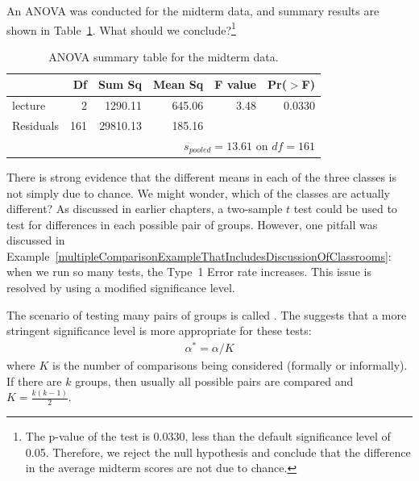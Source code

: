 \begin{exercise} \label{exerExaminingAnovaSummaryTableForMidtermData}
An ANOVA was conducted for the midterm data, and summary results are shown in Table~\ref{anovaSummaryTableForMidtermData}. What should we conclude?\footnote{The p-value of the test is 0.0330, less than the default significance level of 0.05. Therefore, we reject the null hypothesis and conclude that the difference in the average midterm scores are not due to chance.}
\end{exercise}

\begin{table}
\centering
\begin{tabular}{lrrrrr}
  \hline
 & Df & Sum Sq & Mean Sq & F value & Pr($>$F) \\ 
  \hline
lecture & 2 & 1290.11 & 645.06 & 3.48 & 0.0330 \\ 
  Residuals & 161 & 29810.13 & 185.16 &  &  \\ 
   \hline
\multicolumn{6}{r}{$s_{pooled}=13.61$ on $df=161$}
\end{tabular}
\caption{ANOVA summary table for the midterm data.}
\label{anovaSummaryTableForMidtermData}
\end{table}

There is strong evidence that the different means in each of the three classes is not simply due to chance. We might wonder, which of the classes are actually different? As discussed in earlier chapters, a two-sample $t$ test could be used to test for differences in each possible pair of groups. However, one pitfall was discussed in Example~\vref{multipleComparisonExampleThatIncludesDiscussionOfClassrooms}: when we run so many tests, the Type~1 Error rate increases. This issue is resolved by using a modified significance level. 

\begin{termBox}{
The scenario of testing many pairs of groups is called . The  suggests that a more stringent significance level is more appropriate for these tests:
\begin{align*}
\alpha^* = \alpha / K
\end{align*}
where $K$ is the number of comparisons being considered (formally or informally). If there are $k$ groups, then usually all possible pairs are compared and $K=\frac{k(k-1)}{2}$.}
\end{termBox}


